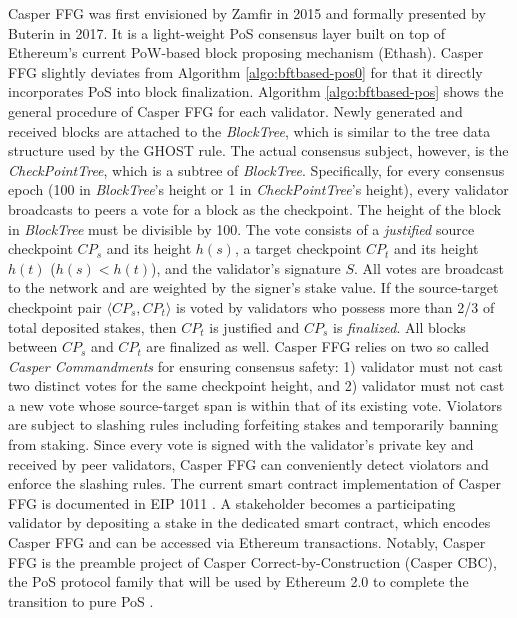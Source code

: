 Casper FFG was first envisioned by Zamfir  in 2015 and formally presented by Buterin  in 2017.
It is a light-weight PoS consensus layer built on top of Ethereum's current PoW-based block proposing mechanism (Ethash). Casper FFG slightly deviates from Algorithm \ref{algo:bftbased-pos0} for that it directly incorporates PoS into block finalization.
Algorithm \ref{algo:bftbased-pos} shows the general procedure of Casper FFG for each validator. Newly generated and received blocks are attached to the \emph{BlockTree}, which is similar to the tree data structure used by the GHOST rule. The actual consensus subject, however, is the \emph{CheckPointTree}, which is a subtree of \emph{BlockTree}.
Specifically, for every consensus epoch (100 in \emph{BlockTree}'s height or 1 in \emph{CheckPointTree}'s height), every validator broadcasts to peers a vote for a block as the checkpoint. The height of the block in \emph{BlockTree} must be divisible by 100. The vote consists of a \emph{justified} source checkpoint $CP_s$ and its height $h(s)$, a target checkpoint $CP_t$ and its height $h(t)$ ($h(s)<h(t)$), and the validator's signature $S$. All votes are broadcast to the network and are weighted by the signer's stake value. If the source-target checkpoint pair $\langle CP_s, CP_t \rangle$ is voted by validators who possess more than 2/3 of total deposited stakes, then $CP_t$ is justified and $CP_s$ is \emph{finalized}. All blocks between $CP_s$ and $CP_t$ are finalized as well. Casper FFG relies on two so called \emph{Casper Commandments} for ensuring consensus safety: 1) validator must not cast two distinct votes for the same checkpoint height, and 2) validator must not cast a new vote whose source-target span is within that of its existing vote. Violators are subject to slashing rules including forfeiting stakes and temporarily banning from staking. Since every vote is signed with the validator's private key and received by peer validators, Casper FFG can conveniently detect violators and enforce the slashing rules. 
The current smart contract implementation of Casper FFG is documented in EIP 1011 . A stakeholder becomes a participating validator by depositing a stake in the dedicated smart contract, which encodes Casper FFG and can be accessed via Ethereum transactions.
Notably, Casper FFG is the preamble project of Casper Correct-by-Construction (Casper CBC), the PoS protocol family that will be used by Ethereum 2.0 to complete the transition to pure PoS . 

